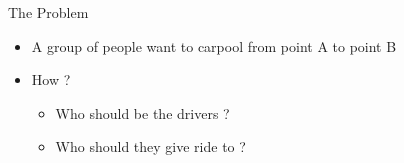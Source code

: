 \begin{frame}{The Problem}
\begin{itemize}
	\item<1> A group of people want to carpool from point A to point B
	\item<2-> How ?
	\begin{itemize}
		\item<3> Who should be the drivers ?
		\item<4> Who should they give ride to ?
	\end{itemize}
\end{itemize}

\centering


\end{frame}